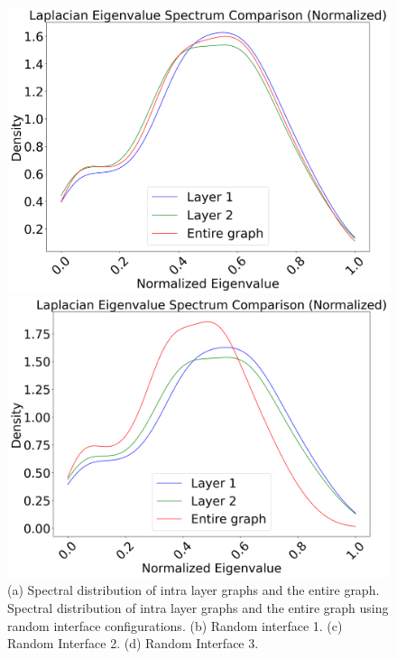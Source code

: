\documentclass[10pt,letterpaper]{article}
\begin{document}
\begin{figure}[h!]
\begin{minipage}[b]{0.25\linewidth}
		\includegraphics[width=\textwidth]{figs/fig15.png}
		\subcaption{}
	\end{minipage}
	
	\vspace{0.5cm}
	
	\begin{minipage}[b]{0.25\linewidth}
		\centering
		\includegraphics[width=\textwidth]{figs/fig16.png}
		\subcaption{}
	\end{minipage}
	\caption{(a) Spectral distribution of intra layer graphs and the entire graph. Spectral distribution of intra layer graphs and the entire graph using random interface configurations. (b) Random interface 1. (c) Random Interface 2. (d) Random Interface 3. \label{fig:spectral}}
\end{figure}
\end{document}
